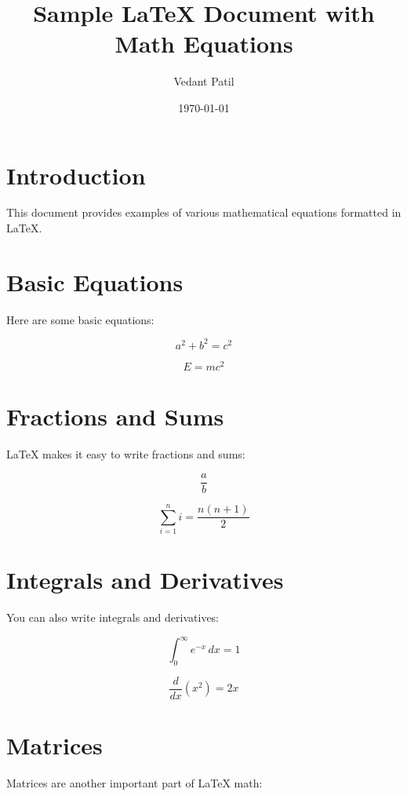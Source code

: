 \documentclass{article}
\title{Sample LaTeX Document with Math Equations}
\author{Vedant Patil}
\date{\today}
\begin{document}
\maketitle

\section{Introduction}
This document provides examples of various mathematical equations formatted in LaTeX.

\section{Basic Equations}
Here are some basic equations:

\begin{equation}
a^2 + b^2 = c^2
\end{equation}

\begin{equation}
E = mc^2
\end{equation}

\section{Fractions and Sums}
LaTeX makes it easy to write fractions and sums:

\begin{equation}
\frac{a}{b}
\end{equation}

\begin{equation}
\sum_{i=1}^{n} i = \frac{n(n+1)}{2}
\end{equation}

\section{Integrals and Derivatives}
You can also write integrals and derivatives:

\begin{equation}
\int_0^\infty e^{-x} \, dx = 1
\end{equation}

\begin{equation}
\frac{d}{dx} \left( x^2 \right) = 2x
\end{equation}

\section{Matrices}
Matrices are another important part of LaTeX math:
\end{document}

